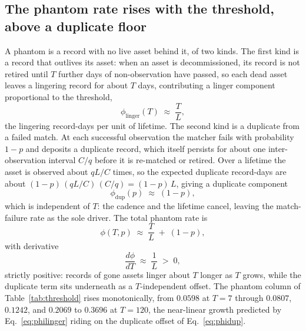 \documentclass[journal]{IEEEtran}
\begin{document}
\subsection{The phantom rate rises with the threshold, above a duplicate floor}
A phantom is a record with no live asset behind it, of two kinds. The first kind is a record that
outlives its asset: when an asset is decommissioned, its record is not retired until $T$ further days
of non-observation have passed, so each dead asset leaves a lingering record for about $T$ days,
contributing a linger component proportional to the threshold,
\begin{equation}
\phi_{\text{linger}}(T) \;\approx\; \frac{T}{L},
\label{eq:philinger}
\end{equation}
the lingering record-days per unit of lifetime. The second kind is a duplicate from a failed match.
At each successful observation the matcher fails with probability $1 - p$ and deposits a duplicate
record, which itself persists for about one inter-observation interval $C / q$ before it is
re-matched or retired. Over a lifetime the asset is observed about $q L / C$ times, so the expected
duplicate record-days are about $(1 - p)\,(q L / C)\,(C / q) = (1 - p)\,L$, giving a duplicate
component
\begin{equation}
\phi_{\text{dup}}(p) \;\approx\; (1 - p),
\label{eq:phidup}
\end{equation}
which is independent of $T$: the cadence and the lifetime cancel, leaving the match-failure rate as
the sole driver. The total phantom rate is
\begin{equation}
\phi(T, p) \;\approx\; \frac{T}{L} \;+\; (1 - p),
\label{eq:phitotal}
\end{equation}
with derivative
\begin{equation}
\frac{d\phi}{dT} \;\approx\; \frac{1}{L} \;>\; 0,
\label{eq:dphidt}
\end{equation}
strictly positive: records of gone assets linger about $T$ longer as $T$ grows, while the duplicate
term sits underneath as a $T$-independent offset. The phantom column of Table~\ref{tab:threshold}
rises monotonically, from $0.0598$ at $T = 7$ through $0.0807$, $0.1242$, and $0.2069$ to $0.3696$ at
$T = 120$, the near-linear growth predicted by Eq.~\eqref{eq:philinger} riding on the duplicate offset
of Eq.~\eqref{eq:phidup}.
\end{document}
